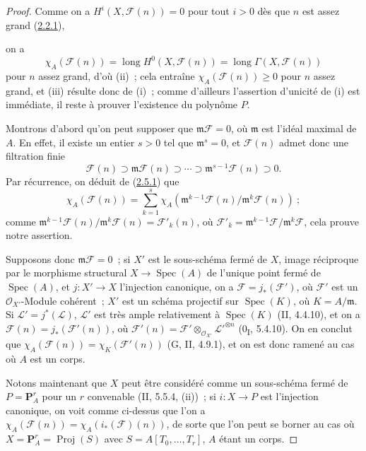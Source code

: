 \begin{proof}
Comme on a $H^i(X,\mathcal F(n))=0$ pour tout $i>0$ dès que $n$ est
assez grand (\hyperref[III.2.2.1-fr]{2.2.1}),

on a
\[
\chi_A(\mathcal F(n))=\operatorname{long}H^0(X,\mathcal F(n))
=\operatorname{long}\Gamma(X,\mathcal F(n))
\]
pour $n$ assez grand, d'où (ii)~; cela entraîne
$\chi_A(\mathcal F(n))\geq0$ pour $n$ assez grand, et (iii) résulte donc
de (i)~; comme d'ailleurs l'assertion d'unicité de (i) est immédiate, il
reste à prouver l'existence du polynôme $P$.

Montrons d'abord qu'on peut supposer que $\mathfrak m\mathcal F=0$, où
$\mathfrak m$ est l'idéal maximal de $A$. En effet, il existe un entier
$s>0$ tel que $\mathfrak m^s=0$, et $\mathcal F(n)$ admet donc une
filtration finie
\[
\mathcal F(n)\supset\mathfrak m\mathcal F(n)\supset\cdots
\supset\mathfrak m^{s-1}\mathcal F(n)\supset0.
\]
Par récurrence, on déduit de
(\hyperref[III.2.5.1-fr]{2.5.1}) que
\[
\chi_A(\mathcal F(n))=\sum_{k=1}^{s}
\chi_A(\mathfrak m^{k-1}\mathcal F(n)/\mathfrak m^k\mathcal F(n))~;
\]
comme
$\mathfrak m^{k-1}\mathcal F(n)/\mathfrak m^k\mathcal F(n)
=\mathcal F'_k(n)$, où
$\mathcal F'_k=\mathfrak m^{k-1}\mathcal F/\mathfrak m^k\mathcal F$,
cela prouve notre assertion.

Supposons donc $\mathfrak m\mathcal F=0$~; si $X'$ est le sous-schéma
fermé de $X$, image réciproque par le morphisme structural
$X\to\operatorname{Spec}(A)$ de l'unique point fermé de
$\operatorname{Spec}(A)$, et $j:X'\to X$ l'injection canonique, on a
$\mathcal F=j_*(\mathcal F')$, où $\mathcal F'$ est un
$\mathcal O_{X'}$-Module cohérent~; $X'$ est un schéma projectif sur
$\operatorname{Spec}(K)$, où $K=A/\mathfrak m$. Si
$\mathcal L'=j^*(\mathcal L)$, $\mathcal L'$ est très ample relativement
à $\operatorname{Spec}(K)$ (II, 4.4.10), et on a
$\mathcal F(n)=j_*(\mathcal F'(n))$, où
$\mathcal F'(n)=\mathcal F'\otimes_{\mathcal O_{X'}}
\mathcal L'^{\otimes n}$ (0\textsubscript{I}, 5.4.10). On en conclut que
$\chi_A(\mathcal F(n))=\chi_K(\mathcal F'(n))$ (G, II, 4.9.1), et on est
donc ramené au cas où $A$ est un corps.

Notons maintenant que $X$ peut être considéré comme un sous-schéma
fermé de $P=\mathbf P_A^r$ pour un $r$ convenable (II, 5.5.4, (ii))~;
si $i:X\to P$ est l'injection canonique, on voit comme ci-dessus que l'on
a $\chi_A(\mathcal F(n))=\chi_A(i_*(\mathcal F)(n))$, de sorte que l'on
peut se borner au cas où $X=\mathbf P_A^r=\operatorname{Proj}(S)$ avec
$S=A[T_0,\ldots,T_r]$, $A$ étant un corps.


\end{proof}
